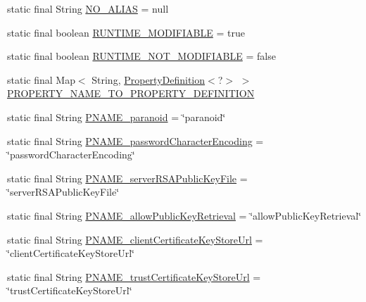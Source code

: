 \begin{DoxyCompactItemize}
\item 
static final String \mbox{\hyperlink{classcom_1_1mysql_1_1cj_1_1conf_1_1_property_definitions_ae71e485e663f4e38c8775a0a5ee3ff6d}{N\+O\+\_\+\+A\+L\+I\+AS}} = null
\item 
static final boolean \mbox{\hyperlink{classcom_1_1mysql_1_1cj_1_1conf_1_1_property_definitions_a78346346b3029e004d85a0682a9c8f10}{R\+U\+N\+T\+I\+M\+E\+\_\+\+M\+O\+D\+I\+F\+I\+A\+B\+LE}} = true
\item 
static final boolean \mbox{\hyperlink{classcom_1_1mysql_1_1cj_1_1conf_1_1_property_definitions_a9b0bc331d96a0d47e581ba734ffd0f50}{R\+U\+N\+T\+I\+M\+E\+\_\+\+N\+O\+T\+\_\+\+M\+O\+D\+I\+F\+I\+A\+B\+LE}} = false
\item 
static final Map$<$ String, \mbox{\hyperlink{interfacecom_1_1mysql_1_1cj_1_1conf_1_1_property_definition}{Property\+Definition}}$<$?$>$ $>$ \mbox{\hyperlink{classcom_1_1mysql_1_1cj_1_1conf_1_1_property_definitions_aa23c596973e4a88e6f242831c532566a}{P\+R\+O\+P\+E\+R\+T\+Y\+\_\+\+N\+A\+M\+E\+\_\+\+T\+O\+\_\+\+P\+R\+O\+P\+E\+R\+T\+Y\+\_\+\+D\+E\+F\+I\+N\+I\+T\+I\+ON}}
\item 
static final String \mbox{\hyperlink{classcom_1_1mysql_1_1cj_1_1conf_1_1_property_definitions_a5cafce96f7f835a605fed527dbfa8e91}{P\+N\+A\+M\+E\+\_\+paranoid}} = \char`\"{}paranoid\char`\"{}
\item 
static final String \mbox{\hyperlink{classcom_1_1mysql_1_1cj_1_1conf_1_1_property_definitions_ac6d48c58b889314d10c3086973384fde}{P\+N\+A\+M\+E\+\_\+password\+Character\+Encoding}} = \char`\"{}password\+Character\+Encoding\char`\"{}
\item 
static final String \mbox{\hyperlink{classcom_1_1mysql_1_1cj_1_1conf_1_1_property_definitions_a3c93b8bea3327a086c2ddb066d21af10}{P\+N\+A\+M\+E\+\_\+server\+R\+S\+A\+Public\+Key\+File}} = \char`\"{}server\+R\+S\+A\+Public\+Key\+File\char`\"{}
\item 
static final String \mbox{\hyperlink{classcom_1_1mysql_1_1cj_1_1conf_1_1_property_definitions_a7707cc2bba3c5e72218d6d645265193c}{P\+N\+A\+M\+E\+\_\+allow\+Public\+Key\+Retrieval}} = \char`\"{}allow\+Public\+Key\+Retrieval\char`\"{}
\item 
static final String \mbox{\hyperlink{classcom_1_1mysql_1_1cj_1_1conf_1_1_property_definitions_a5f533e8d47c8d8d9f7c044c9699f3ac8}{P\+N\+A\+M\+E\+\_\+client\+Certificate\+Key\+Store\+Url}} = \char`\"{}client\+Certificate\+Key\+Store\+Url\char`\"{}
\item 
static final String \mbox{\hyperlink{classcom_1_1mysql_1_1cj_1_1conf_1_1_property_definitions_a1b4cad2e4eae50e7ba78db25bd09d898}{P\+N\+A\+M\+E\+\_\+trust\+Certificate\+Key\+Store\+Url}} = \char`\"{}trust\+Certificate\+Key\+Store\+Url\char`\"{}

\end{DoxyCompactItemize}
